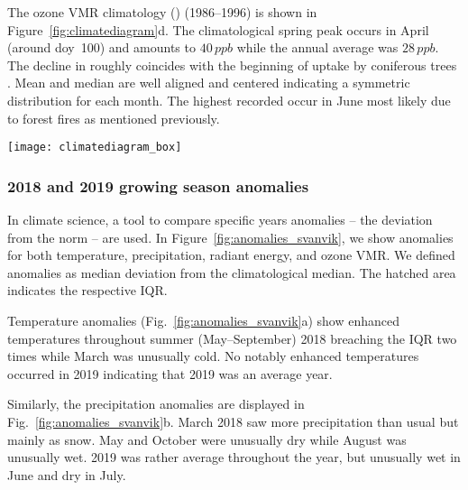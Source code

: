 \documentclass[bg, manuscript]{copernicus}
\begin{document}
The ozone VMR climatology () (1986--1996) is shown in Figure~\ref{fig:climatediagram}d. The climatological spring peak occurs in April (around \unit{doy}~100) and amounts to $40\,\unit{ppb}$ while the annual average  was $28\,\unit{ppb}$. The decline in  roughly coincides with the beginning of  uptake by coniferous trees \citep{TB:Kolari2007, TP:Wallin2013}. Mean and median are well aligned and centered indicating a symmetric distribution for each month. The highest recorded  occur in June most likely due to forest fires as mentioned previously.

\begin{figure*}[t]
  \texttt{[image: climatediagram\_box]}
  \caption{Climate diagram based on meteorological data for Svanvik/Pasvik (1992--2012). Ozone climatology based on ozone monitoring data (1986--1996). A box indicates the upper/lower quartile, whiskers the $1.5\times$ Interquartile Range (IQR), and circles outliers. The median is marked by a colored horizontal line and the mean by a triangle. Notches indicate the confidence interval around the median. (a) Temperature; (b) accumulated precipitation; (c) radiant energy; (d) ozone VMR}
  \label{fig:climatediagram}
\end{figure*}

\subsubsection{2018 and 2019 growing season anomalies}
\label{subsec:anomalies}

In climate science, a tool to compare specific years anomalies -- the deviation from the norm --  are used. In Figure~\ref{fig:anomalies_svanvik}, we show anomalies for both temperature, precipitation, radiant energy, and ozone VMR. We defined anomalies as median deviation from the climatological median. The hatched area indicates the respective IQR.

Temperature anomalies (Fig.~\ref{fig:anomalies_svanvik}a) show enhanced temperatures throughout summer (May--September) 2018 breaching the IQR two times while March was unusually cold. No notably enhanced temperatures occurred in 2019 indicating that 2019 was an average year.

Similarly, the precipitation anomalies are displayed in Fig.~\ref{fig:anomalies_svanvik}b. March 2018 saw more precipitation than usual but mainly as snow. May and October were unusually dry while August was unusually wet. 2019 was rather average throughout the year, but unusually wet in June and dry in July.
\end{document}
